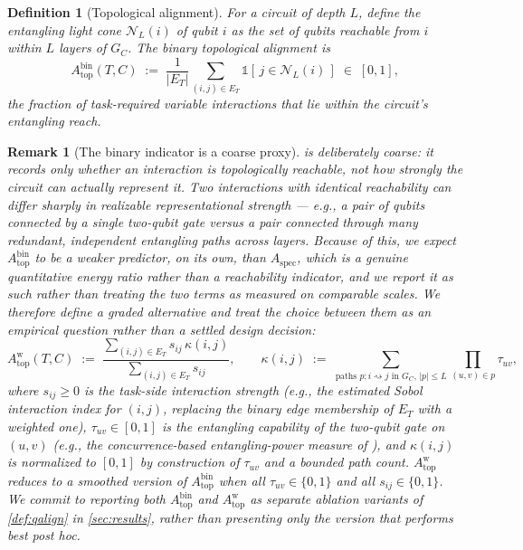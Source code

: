\documentclass[11pt]{article}
\newtheorem{definition}[theorem]{Definition}
\newtheorem{remark}[theorem]{Remark}
\newcommand{\Aspec}{A_{\mathrm{spec}}}
\newcommand{\Atop}{A_{\mathrm{top}}}
\begin{document}
\begin{definition}[Topological alignment]
\label{def:topological-alignment}
For a circuit of depth $L$, define the entangling \emph{light cone} $\mathcal{N}_L(i)$ of qubit $i$ as the set of qubits reachable from $i$ within $L$ layers of $G_C$. The \emph{binary} topological alignment is
\[
    \Atop^{\mathrm{bin}}(T,C) \;:=\; \frac{1}{|E_T|} \sum_{(i,j) \in E_T} \mathbb{1}\!\left[\, j \in \mathcal{N}_L(i) \,\right] \;\in\; [0,1],
\]
the fraction of task-required variable interactions that lie within the circuit's entangling reach.
\end{definition}

\begin{remark}[The binary indicator is a coarse proxy]
\label{rem:atop-binary-coarse}
 is deliberately coarse: it records only whether an interaction is topologically \emph{reachable}, not how strongly the circuit can actually represent it. Two interactions with identical reachability can differ sharply in realizable representational strength --- e.g., a pair of qubits connected by a single two-qubit gate versus a pair connected through many redundant, independent entangling paths across layers. Because of this, we expect $\Atop^{\mathrm{bin}}$ to be a weaker predictor, on its own, than $\Aspec$, which is a genuine quantitative energy ratio rather than a reachability indicator, and we report it as such rather than treating the two terms as measured on comparable scales. We therefore define a graded alternative and treat the choice between them as an empirical question rather than a settled design decision:
\[
    \Atop^{\mathrm{w}}(T,C) \;:=\; \frac{\sum_{(i,j)\in E_T} s_{ij}\, \kappa(i,j)}{\sum_{(i,j)\in E_T} s_{ij}}, \qquad \kappa(i,j) \;:=\; \sum_{\text{paths } p: i \rightsquigarrow j \text{ in } G_C,\, |p|\le L} \prod_{(u,v)\in p} \tau_{uv},
\]
where $s_{ij} \ge 0$ is the task-side interaction \emph{strength} (e.g., the estimated Sobol interaction index for $(i,j)$, replacing the binary edge membership of $E_T$ with a weighted one), $\tau_{uv} \in [0,1]$ is the entangling capability of the two-qubit gate on $(u,v)$ (e.g., the concurrence-based entangling-power measure of \citet{sim2019expressibility}), and $\kappa(i,j)$ is normalized to $[0,1]$ by construction of $\tau_{uv}$ and a bounded path count. $\Atop^{\mathrm{w}}$ reduces to a smoothed version of $\Atop^{\mathrm{bin}}$ when all $\tau_{uv}\in\{0,1\}$ and all $s_{ij}\in\{0,1\}$. We commit to reporting both $\Atop^{\mathrm{bin}}$ and $\Atop^{\mathrm{w}}$ as separate ablation variants of \cref{def:qalign} in \cref{sec:results}, rather than presenting only the version that performs best post hoc.
\end{remark}
\end{document}
